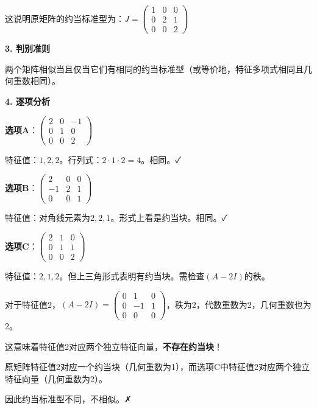 \documentclass[standard]{ExBook}
\begin{document}
\begin{qitems}
\begin{bbox}
\begin{solution}
            这说明原矩阵的约当标准型为：$J = \begin{pmatrix} 1 & 0 & 0 \\ 0 & 2 & 1 \\ 0 & 0 & 2 \end{pmatrix}$
            
            \textbf{3. 判别准则}
            
            两个矩阵相似当且仅当它们有相同的约当标准型（或等价地，特征多项式相同且几何重数相同）。
            
            \textbf{4. 逐项分析}
            
            \textbf{选项A}：$\begin{pmatrix} 2 & 0 & -1 \\ 0 & 1 & 0 \\ 0 & 0 & 2 \end{pmatrix}$
            
            特征值：$1, 2, 2$。行列式：$2 \cdot 1 \cdot 2 = 4$。相同。✓
            
            \textbf{选项B}：$\begin{pmatrix} 2 & 0 & 0 \\ -1 & 2 & 1 \\ 0 & 0 & 1 \end{pmatrix}$
            
            特征值：对角线元素为$2, 2, 1$。形式上看是约当块。相同。✓
            
            \textbf{选项C}：$\begin{pmatrix} 2 & 1 & 0 \\ 0 & 1 & 1 \\ 0 & 0 & 2 \end{pmatrix}$
            
            特征值：$2, 1, 2$。但上三角形式表明有约当块。需检查$(A-2I)$的秩。
            
            对于特征值2，$(A-2I) = \begin{pmatrix} 0 & 1 & 0 \\ 0 & -1 & 1 \\ 0 & 0 & 0 \end{pmatrix}$，秩为2，代数重数为2，几何重数也为2。

            这意味着特征值2对应两个独立特征向量，\textbf{不存在约当块}！

            原矩阵特征值2对应一个约当块（几何重数为1），而选项C中特征值2对应两个独立特征向量（几何重数为2）。
            
            因此约当标准型不同，不相似。✗
            

\end{solution}
\end{bbox}
\end{qitems}
\end{document}
